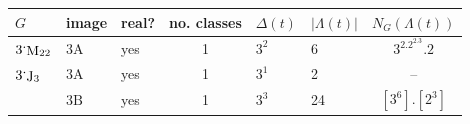 \documentclass[11pt,a4paper]{amsart}
\theoremstyle{plain}
\theoremstyle{definition}
\theoremstyle{remark}
\theoremstyle{remark}
\theoremstyle{remark}
\theoremstyle{definition}
\newcommand{\ns}{\mathbin{\mspace{-4mu}\vcenter{\hbox{\raisebox{1ex}{$\cdot$}}}\mspace{-4mu}}}
\DeclareMathOperator{\McL}{McL}
\DeclareMathOperator{\M}{M}
\DeclareMathOperator{\J}{J}
\DeclareMathOperator{\Suz}{Suz}
\DeclareMathOperator{\ON}{O'N}
\DeclareMathOperator{\Fi}{Fi}
\DeclareMathOperator{\Alt}{Alt}
\begin{document}
\begin{table}[h]
\centering
\begin{tabular}{|lllcllc|}
\hline
$G$             & image         & real? & no. classes & $\Delta(t)$ & $|\Lambda(t)|$ & $N_G(\Lambda(t))$ \\ \hline
$3\ns\M_{22}$   & $3\mathrm{A}$ & yes   & 1           & $3^{2}$     & 6              & $3^2.2^2.3.2$     \\ \hline
$3\ns\J_{3}$    & $3\mathrm{A}$ & yes   & 1           & $3^{1}$     & 2              & --                \\
                & $3\mathrm{B}$ & yes   & 1           & $3^{3}$     & 24             & $[3^6].[2^3]$     \\ \hline

\end{tabular}
\end{table}
\end{document}
